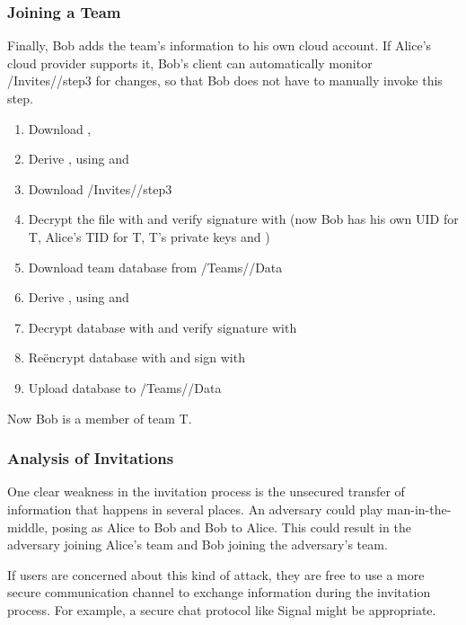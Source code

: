 \documentclass[pldi,10pt]{sigplanconf-pldi16}
\begin{document}
\subsubsection{Joining a Team}

Finally, Bob adds the team's information to his own cloud account.
If Alice's cloud provider supports it, Bob's client can automatically monitor \slash Invites\slash {}\slash step3 for changes, so that Bob does not have to manually invoke this step.

\begin{enumerate}
\item Download , 
\item Derive , using  and 
\item Download \slash Invites\slash {}\slash step3
\item Decrypt the file with  and verify signature with  (now Bob has his own UID for T, Alice's TID for T, T's private keys and )
\item Download team database from \slash Teams\slash {}\slash Data
\item Derive , using  and 
\item Decrypt database with  and verify signature with 
\item Re\"{e}ncrypt database with  and sign with 
\item Upload database to \slash Teams\slash {}\slash Data
\end{enumerate}

Now Bob is a member of team T.

\subsubsection{Analysis of Invitations}

One clear weakness in the invitation process is the unsecured transfer of information that happens in several places.
An adversary could play man-in-the-middle, posing as Alice to Bob and Bob to Alice.
This could result in the adversary joining Alice's team and Bob joining the adversary's team.

If users are concerned about this kind of attack, they are free to use a more secure communication channel to exchange information during the invitation process.
For example, a secure chat protocol like Signal might be appropriate.
\end{document}
